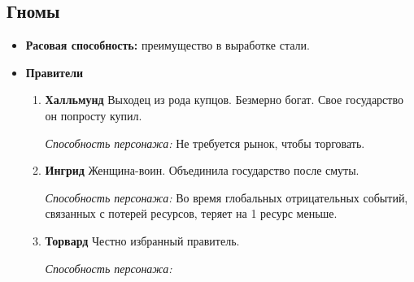 \documentclass[a4paper,12pt,landscape]{article}
\begin{document}
    \subsection{Гномы}
    \begin{itemize}
      \item \textbf{Расовая способность:} преимущество в выработке стали.

      \item \textbf{Правители}
        \begin{enumerate}
          \item \textbf{Халльмунд}
          Выходец из рода купцов. Безмерно богат. Свое государство он попросту купил.

          \textit{Способность персонажа:} Не требуется рынок, чтобы торговать.
          
          \item \textbf{Ингрид}
          Женщина-воин. Объединила государство после смуты.
          
          \textit{Способность персонажа:} Во время глобальных отрицательных событий, связанных с потерей ресурсов, теряет на 1 ресурс меньше.
          
          \item \textbf{Торвард}
          Честно избранный правитель.
          
          \textit{Способность персонажа:}
        \end{enumerate}
    \end{itemize}
    
\end{document}
